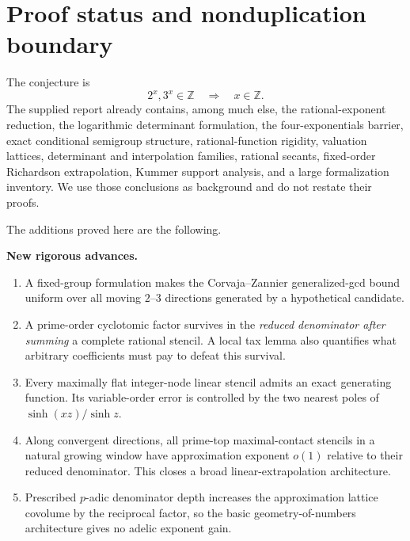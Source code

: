 \documentclass[11pt]{article}
\theoremstyle{definition}
\newcommand{\Z}{\mathbb Z}
\begin{document}
\tableofcontents
\newpage

\section{Proof status and nonduplication boundary}

The conjecture is
\begin{equation}
  2^x,3^x\in\Z \quad\Longrightarrow\quad x\in\Z.
  \label{eq:conjecture}
\end{equation}
The supplied report already contains, among much else, the rational-exponent
reduction, the logarithmic determinant formulation, the four-exponentials
barrier, exact conditional semigroup structure, rational-function rigidity,
valuation lattices, determinant and interpolation families, rational secants,
fixed-order Richardson extrapolation, Kummer support analysis, and a large
formalization inventory.  We use those conclusions as background and do not
restate their proofs.

The additions proved here are the following.

\begin{progressbox}
\textbf{New rigorous advances.}
\begin{enumerate}[leftmargin=*,itemsep=3pt]
\item A fixed-group formulation makes the Corvaja--Zannier generalized-gcd
bound uniform over all moving $2$--$3$ directions generated by a hypothetical
candidate.
\item A prime-order cyclotomic factor survives in the \emph{reduced
 denominator after summing} a complete rational stencil.  A local tax lemma
also quantifies what arbitrary coefficients must pay to defeat this survival.
\item Every maximally flat integer-node linear stencil admits an exact
generating function.  Its variable-order error is controlled by the two
nearest poles of $\sinh(xz)/\sinh z$.
\item Along convergent directions, all prime-top maximal-contact stencils in a
natural growing window have approximation exponent $o(1)$ relative to their
reduced denominator.  This closes a broad linear-extrapolation architecture.
\item Prescribed $p$-adic denominator depth increases the approximation
lattice covolume by the reciprocal factor, so the basic geometry-of-numbers
architecture gives no adelic exponent gain.
\end{enumerate}
\end{progressbox}
\end{document}
